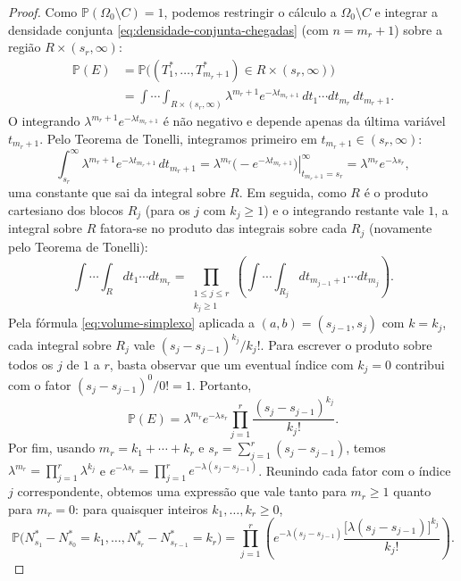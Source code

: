 \documentclass[12pt,portuguese]{article}
\theoremstyle{definition}
\theoremstyle{plainexercise}
\theoremstyle{starredexercise}
\theoremstyle{definition}
\begin{document}
\begin{proof}
Como $\mathbb{P}(\Omega_0\setminus C)=1$, podemos restringir o cálculo a
$\Omega_0\setminus C$ e integrar a densidade conjunta
\eqref{eq:densidade-conjunta-chegadas} (com $n=m_r+1$) sobre a região
$R\times(s_r,\infty)$:
\begin{align*}
  \mathbb{P}(E)
  &=\mathbb{P}\bigl((T_1^*,\ldots,T_{m_r+1}^*)\in R\times(s_r,\infty)\bigr)
  \\[0.3cm]
  &=\int\cdots\int_{R\times(s_r,\infty)}
    \lambda^{m_r+1}e^{-\lambda t_{m_r+1}}\,
    dt_1\cdots dt_{m_r}\,dt_{m_r+1}.
\end{align*}
O integrando $\lambda^{m_r+1}e^{-\lambda t_{m_r+1}}$ é não negativo e depende
apenas da última variável $t_{m_r+1}$. Pelo Teorema de Tonelli, integramos
primeiro em $t_{m_r+1}\in(s_r,\infty)$:
\[
  \int_{s_r}^{\infty}\lambda^{m_r+1}e^{-\lambda t_{m_r+1}}\,dt_{m_r+1}
  =\lambda^{m_r}\left.\bigl(-e^{-\lambda t_{m_r+1}}\bigr)\right|_{t_{m_r+1}=s_r}^{\infty}
  =\lambda^{m_r}e^{-\lambda s_r},
\]
uma constante que sai da integral sobre $R$. Em seguida, como $R$ é o produto
cartesiano dos blocos $R_j$ (para os $j$ com $k_j\geqslant1$) e o integrando
restante vale $1$, a integral sobre $R$ fatora-se no produto das integrais
sobre cada $R_j$ (novamente pelo Teorema de Tonelli):
\[
  \int\cdots\int_R dt_1\cdots dt_{m_r}
  =\prod_{\substack{1\leqslant j\leqslant r\\ k_j\geqslant1}}
    \left(\int\cdots\int_{R_j} dt_{m_{j-1}+1}\cdots dt_{m_j}\right).
\]
Pela fórmula \eqref{eq:volume-simplexo} aplicada a $(a,b)=(s_{j-1},s_j)$ com
$k=k_j$, cada integral sobre $R_j$ vale $(s_j-s_{j-1})^{k_j}/k_j!$. Para
escrever o produto sobre todos os $j$ de $1$ a $r$, basta observar que um
eventual índice com $k_j=0$ contribui com o fator $(s_j-s_{j-1})^0/0!=1$.
Portanto,
\[
  \mathbb{P}(E)
  =\lambda^{m_r}e^{-\lambda s_r}\prod_{j=1}^{r}\frac{(s_j-s_{j-1})^{k_j}}{k_j!}.
\]
Por fim, usando $m_r=k_1+\cdots+k_r$ e $s_r=\sum_{j=1}^r(s_j-s_{j-1})$, temos
$\lambda^{m_r}=\prod_{j=1}^r\lambda^{k_j}$ e
$e^{-\lambda s_r}=\prod_{j=1}^r e^{-\lambda(s_j-s_{j-1})}$. Reunindo cada fator
com o índice $j$ correspondente, obtemos uma expressão que vale tanto para
$m_r\geqslant1$ quanto para $m_r=0$: para quaisquer inteiros
$k_1,\ldots,k_r\geqslant0$,
\begin{equation}\label{eq:distribuicao-conjunta-incrementos}
  \mathbb{P}\bigl(N_{s_1}^*-N_{s_0}^*=k_1,\ldots,N_{s_r}^*-N_{s_{r-1}}^*=k_r\bigr)
  =\prod_{j=1}^{r}\left(e^{-\lambda(s_j-s_{j-1})}
    \frac{\bigl[\lambda(s_j-s_{j-1})\bigr]^{k_j}}{k_j!}\right).
\end{equation}


\end{proof}
\end{document}
